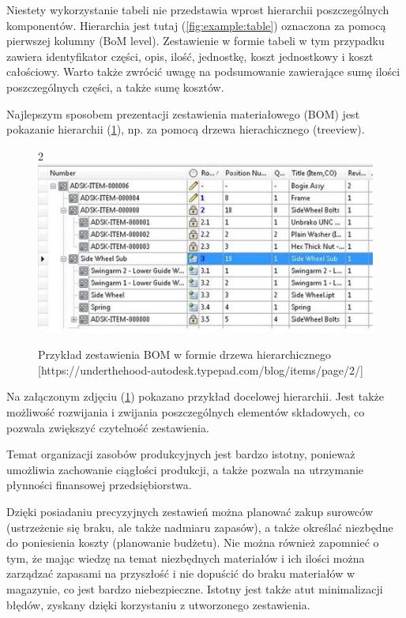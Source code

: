 \documentclass[12pt,twoside]{article}
\begin{document}
Niestety wykorzystanie tabeli nie przedstawia wprost hierarchii poszczególnych komponentów. Hierarchia jest tutaj (\ref{fig:example:table}) oznaczona za pomocą pierwszej kolumny (BoM level). Zestawienie w formie tabeli w tym przypadku zawiera identyfikator części, opis, ilość, jednostkę, koszt jednostkowy i koszt całościowy. Warto także zwrócić uwagę na podsumowanie zawierające sumę ilości poszczególnych części, a także sumę kosztów.

Najlepszym sposobem prezentacji zestawienia materiałowego (BOM) jest pokazanie hierarchii (\ref{fig:example:hierarchy}), np. za pomocą drzewa hierachicznego (treeview).

\begin{figure}2
	\centering
	\includegraphics[width=\textwidth]{figures/examples/hierarchy.jpg}
	\caption{Przykład zestawienia BOM w formie drzewa hierarchicznego [https://underthehood-autodesk.typepad.com/blog/items/page/2/]}
\label{fig:example:hierarchy}
\end{figure}

Na załączonym zdjęciu (\ref{fig:example:hierarchy}) pokazano przykład docelowej hierarchii. Jest także możliwość rozwijania i zwijania poszczególnych elementów składowych, co pozwala zwiększyć czytelność zestawienia.

Temat organizacji zasobów produkcyjnych jest bardzo istotny, ponieważ umożliwia zachowanie ciągłości produkcji, a także pozwala na utrzymanie płynności finansowej przedsiębiorstwa.

Dzięki posiadaniu precyzyjnych zestawień można planować zakup surowców (ustrzeżenie się braku, ale także nadmiaru zapasów), a także określać niezbędne do poniesienia koszty (planowanie budżetu). Nie można również zapomnieć o tym, że mając wiedzę na temat niezbędnych materiałów i ich ilości można zarządzać zapasami na przyszłość i nie dopuścić do braku materiałów w magazynie, co jest bardzo niebezpieczne. Istotny jest także atut minimalizacji błędów, zyskany dzięki korzystaniu z utworzonego zestawienia.
\end{document}

